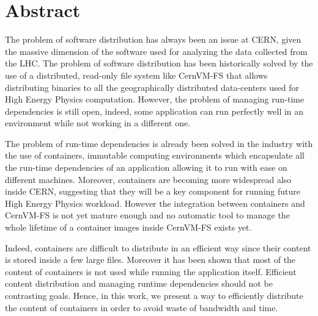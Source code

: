 \begingroup
\let\clearpage\relax
\let\cleardoublepage\relax
\let\cleardoublepage\relax

\chapter*{Abstract} 

The problem of software distribution has always been an issue at CERN, given
the massive dimension of the software used for analyzing the data collected
from the LHC. The problem of software distribution has been historically solved
by the use of a distributed, read-only file system like CernVM-FS that allows
distributing binaries to all the geographically distributed data-centers used
for High Energy Physics computation. However, the problem of managing run-time
dependencies is still open, indeed, some application can run perfectly well in
an environment while not working in a different one.

The problem of run-time dependencies is already been solved in the industry
with the use of containers, immutable computing environments which encapsulate
all the run-time dependencies of an application allowing it to run with ease on
different machines. Moreover, containers are becoming more widespread also
inside CERN, suggesting that they will be a key component for running future
High Energy Physics workload. However the integration between containers and
CernVM-FS is not yet mature enough and no automatic tool to manage the whole
lifetime of a container images inside CernVM-FS exists yet.

Indeed, containers are difficult to distribute in an efficient way since their
content is stored inside a few large files. Moreover it has been shown that
most of the content of containers is not used while running the application
itself. Efficient content distribution and managing runtime dependencies should
not be contrasting goals. Hence, in this work, we present a way to efficiently
distribute the content of containers in order to avoid waste of bandwidth and
time.

\newpage

